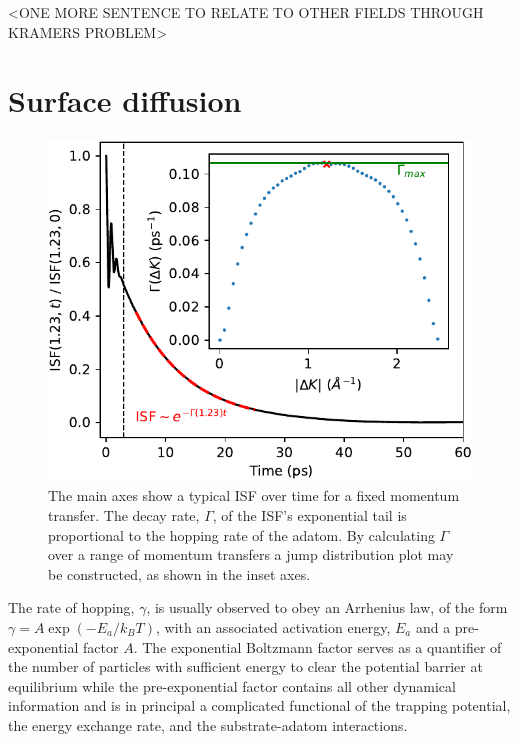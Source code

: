 \documentclass[7pt]{article}
\begin{document}
<ONE MORE SENTENCE TO RELATE TO OTHER FIELDS THROUGH KRAMERS PROBLEM> 

\section*{Surface diffusion}

\begin{figure}
	\centering
	\includegraphics[width=1.0\columnwidth]{isf_dk}
	\caption{The main axes show a typical ISF over time for a fixed momentum transfer. The decay rate, $\Gamma$, of the ISF's exponential tail is proportional to the hopping rate of the adatom. By calculating $\Gamma$ over a range of momentum transfers a jump distribution plot may be constructed, as shown in the inset axes.} 
	\label{fig:isf_dk}
\end{figure}


The rate of hopping, $\gamma$, is usually observed to obey an Arrhenius law, of the form $\gamma = A\exp\left(-E_a/k_BT\right)$, with an associated activation energy, $E_a$ and a pre-exponential factor $A$. The exponential Boltzmann factor serves as a quantifier of the number of particles with sufficient energy to clear the potential barrier at equilibrium while the pre-exponential factor contains all other dynamical information and is in principal a complicated functional of the trapping potential, the energy exchange rate, and the substrate-adatom interactions. 
\end{document}
